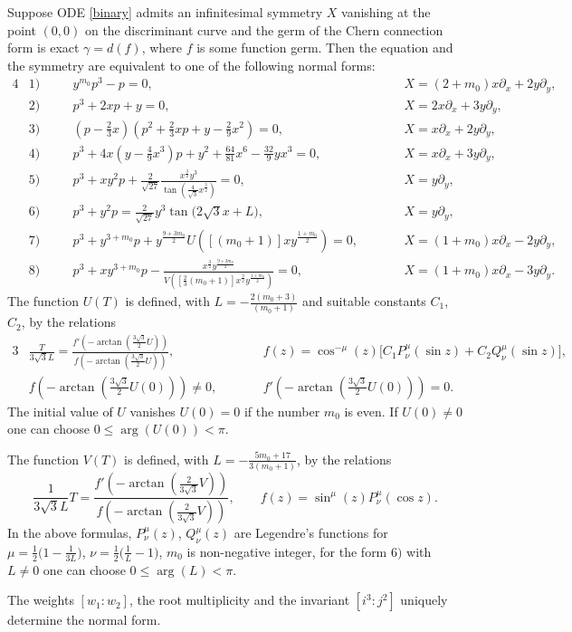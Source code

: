 \documentclass[pdftex]{sigma}
\begin{document}
\begin{theorem}[\cite{Ac}]\label{homoexact}
Suppose ODE \eqref{binary} admits an infinitesimal symmetry $X$ vanishing at the point $(0,0)$
on the discriminant curve and the germ of the Chern connection form is exact $\gamma=d(f)$,
where $f$ is some function
germ.
Then the equation and the symmetry are equivalent to one of the
following normal forms:
\begin{alignat*}{4}
&1)\quad&&y^{m_0}p^3-p=0, \quad&& X=(2+m_0)x\partial_x+2y\partial_y,&\\
&2)\quad&&p^3+2xp+y=0, \quad&& X=2x\partial_x+3y\partial_y,&\\
&3)\quad&&\left(p-\frac23x \right)\left(p^2+\frac23xp+y-\frac{2}{9}x^2\right)=0, \qquad&& X=x\partial_x+2y\partial_y,&\\
&4)\quad&&p^3+4x\left(y-\frac{4}{9}x^3\right)p+y^2+\frac{64}{81}x^6-\frac{32}{9}yx^3=0, \qquad&& X=x\partial_x+3y\partial_y,&\\
&5)\quad&&p^3+xy^2p+\frac{2}{\sqrt{27}}\frac{x^{\frac32}y^3}{\tan\left(\frac{4}{\sqrt{3}}x^{\frac32}\right)}=0, \qquad&& X=y\partial_y, &\\
&6)\quad&&p^3+y^2p=\frac{2}{\sqrt{27}}y^3\tan\big(2\sqrt{3}x+L\big), \qquad&& X=y\partial_y, &\\
&7)\quad&&p^3+y^{3+m_0}p+y^{\frac{9+3m_0}{2}}U\left(\left[(m_0+1)\right]xy^{\frac{1+m_0}{2}}\right)=0, \qquad&& X=(1+m_0)x\partial_x-2y\partial_y,&\\
&8)\quad&&p^3+xy^{3+m_0}p-\frac{x^{\frac32}y^{\frac{9+3m_0}{2}}}{V\left(\left[\frac23(m_0+1)\right]x^{\frac32}y^{\frac{1+m_0}{2}}\right)}=0, \qquad&& X=(1+m_0)x\partial_x-3y\partial_y.&
\end{alignat*}
The function $U(T)$ is defined, with $L=-\frac{2(m_0+3)}{(m_0+1)}$ and suitable constants $C_1$, $C_2$, by the relations
\begin{alignat*}{3}
& \frac{T}{3\sqrt3L}=\frac{f'\left(-\arctan\left(\frac{3\sqrt3}{2}U\right)\right)}{f\left(-\arctan\left(\frac{3\sqrt3}{2}U\right)\right)},\qquad && f(z)=\cos^{-\mu} (z)\big[C_1P^{\mu}_{\nu}(\sin z)+ C_2Q^{\mu}_{\nu}(\sin z)\big], & \\
& f\left(-\arctan\left(\frac{3\sqrt3}{2}U(0)\right)\right)\ne 0, \qquad && f'\left(-\arctan\left(\frac{3\sqrt3}{2}U(0)\right)\right)=0. &
\end{alignat*}
The initial value of $U$ vanishes $U(0)=0$ if the number $m_0$ is even.
If $U(0)\ne 0$ one can choose $0\leq\arg(U(0)) <\pi$.

The function $V(T)$ is defined, with $L=-\frac{5m_0+17}{3(m_0+1)}$, by the relations
\[
\frac{1}{3\sqrt3 L}T=\frac{f'\left(-\arctan\left(\frac{2}{3\sqrt3}V\right)\right)}{f\left(-\arctan\left(\frac{2}{3\sqrt3}V\right)\right)},\qquad f(z)=\sin^{\mu} (z)P^{\mu}_{\nu}(\cos z).
\]
In the above formulas, $P^{\mu}_{\nu}(z)$, $Q^{\mu}_{\nu}(z)$ are Legendre's functions
for $\mu=\frac{1}{2}\big(1-\frac{1}{3L}\big)$, $\nu=\frac{1}{2}\big(\frac{1}{L}-1\big)$, $m_0$ is non-negative integer,
for the form $6)$ with $L\ne 0$ one can choose $0\leq\arg(L) <\pi$.

The weights $ [w_1:w_2 ]$, the root multiplicity and the invariant $\left[i^3:j^2\right]$ uniquely determine the normal form.
\end{theorem}
\end{document}
